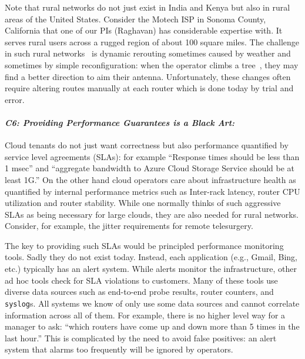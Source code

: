 Note that rural networks do not just exist in India and Kenya but also in rural areas of the United States. Consider the Motech ISP in Sonoma County, California that one of our PIs (Raghavan) has considerable expertise with. It serves rural users across a rugged region of about 100 square miles. The challenge in such rural networks~\cite{barathwisp} is dynamic rerouting sometimes caused by weather and sometimes by simple reconfiguration: when the operator climbs a tree~\cite{barathwisp}, they may find a better direction to aim their antenna.  Unfortunately, these changes often require altering routes manually at each router which is done today by trial and error.

\paragraph*{\em C6: Providing Performance Guarantees is a Black Art:}
Cloud tenants do not just want correctness but also performance quantified by service level agreements (SLAs): for example ``Response times should be less than 1 msec'' and ``aggregate bandwidth to Azure Cloud Storage Service should be at least 1G.''
On the other hand cloud operators care about infrastructure health as quantified by internal performance metrics such as Inter-rack latency, router CPU utilization and router stability.  While
one normally thinks of such aggressive SLAs as being necessary for large clouds, they are also
needed for rural networks.  Consider, for example, the jitter requirements for remote telesurgery.

The key to providing such SLAs would be principled performance monitoring tools. Sadly they do not exist today. Instead, each application (e.g., Gmail, Bing, etc.) typically has an alert system. While alerts monitor the infrastructure, other ad hoc tools check for SLA violations to customers.  Many of these tools use diverse data sources such as end-to-end probe results, router counters, and \texttt{syslog}s.  All systems we know of only use some data sources and cannot correlate information across all of them.  For example, there is no higher level way for a manager to ask: ``which routers have come up and down more than 5 times in the last hour.''  This is complicated by the need to avoid false positives: an alert system that alarms too frequently will be ignored by operators.

